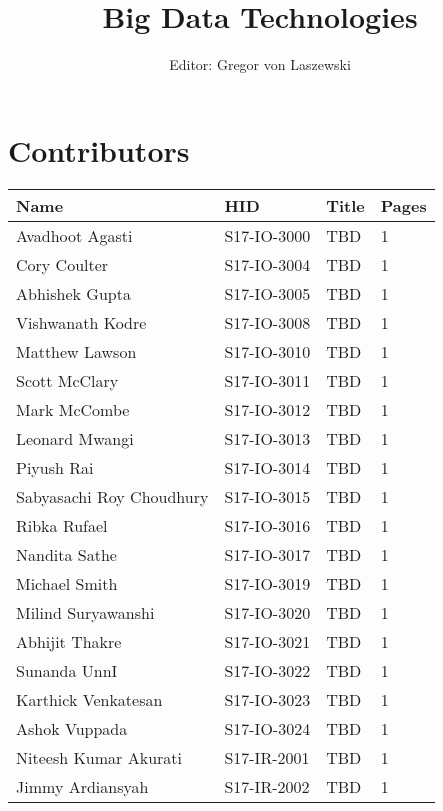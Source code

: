 \documentclass[12pt]{report}
\begin{document}
\title{Big Data Technologies}

\author{Editor: Gregor von Laszewski}
\maketitle

\newpage

\section{Contributors}

\begin{footnotesize}
\begin{tabular}{|llll|}
\hline \textbf{Name} & \textbf{HID} & \textbf{Title} & \textbf{Pages}\\ \hline \hline
Avadhoot Agasti & S17-IO-3000 & TBD & 1 \\
\hline
Cory Coulter & S17-IO-3004 & TBD & 1 \\
\hline
Abhishek Gupta & S17-IO-3005 & TBD & 1 \\
\hline
Vishwanath Kodre & S17-IO-3008 & TBD & 1 \\
\hline
Matthew Lawson & S17-IO-3010 & TBD & 1 \\
\hline
Scott McClary & S17-IO-3011 & TBD & 1 \\
\hline
Mark McCombe & S17-IO-3012 & TBD & 1 \\
\hline
Leonard Mwangi & S17-IO-3013 & TBD & 1 \\
\hline
Piyush Rai & S17-IO-3014 & TBD & 1 \\
\hline
Sabyasachi Roy Choudhury & S17-IO-3015 & TBD & 1 \\
\hline
Ribka Rufael & S17-IO-3016 & TBD & 1 \\
\hline
Nandita Sathe & S17-IO-3017 & TBD & 1 \\
\hline
Michael Smith & S17-IO-3019 & TBD & 1 \\
\hline
Milind Suryawanshi & S17-IO-3020 & TBD & 1 \\
\hline
Abhijit Thakre & S17-IO-3021 & TBD & 1 \\
\hline
Sunanda UnnI & S17-IO-3022 & TBD & 1 \\
\hline
Karthick Venkatesan & S17-IO-3023 & TBD & 1 \\
\hline
Ashok Vuppada & S17-IO-3024 & TBD & 1 \\
\hline
Niteesh Kumar Akurati & S17-IR-2001 & TBD & 1 \\
\hline
Jimmy Ardiansyah & S17-IR-2002 & TBD & 1 \\

\end{tabular}
\end{footnotesize}
\end{document}

